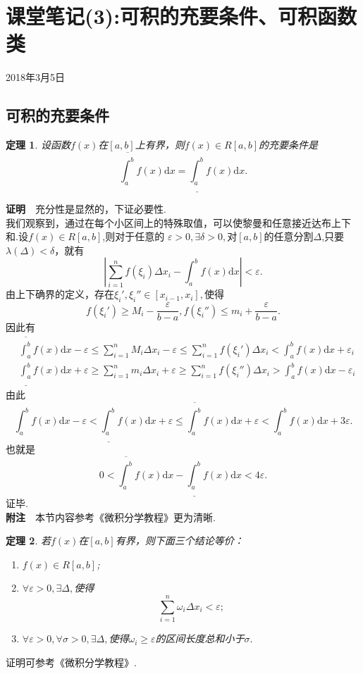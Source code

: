 \documentclass[UTF8]{article}
\newcommand{\dx}{\mathrm{d}x}
\newcommand{\zm}{\textbf{证明}$\quad$}
\newcommand{\fz}{\textbf{附注}$\quad$}
\newtheorem{thm}{\hspace{2em}定理}[section]
\begin{document}
\section{课堂笔记(3):可积的充要条件、可积函数类}
\begin{center}
  2018年3月5日
\end{center}
\subsection{可积的充要条件}
\begin{thm}
  设函数$f(x)$在$[a,b]$上有界，则$f(x)\in R[a,b]$的充要条件是
  $$\overline{\int_a^b}f(x)\dx=\underline{\int_a^b}f(x)\dx.$$
\end{thm}
\zm 充分性是显然的，下证必要性.\\
我们观察到，通过在每个小区间上的特殊取值，可以使黎曼和任意接近达布上下和.设$f(x)\in R[a,b]$,则对于任意的
$\varepsilon>0,\exists\delta>0,$对$[a,b]$的任意分割$\Delta$,只要$\lambda(\Delta)<\delta$，就有
$$\left|\sum_{i=1}^nf(\xi_i)\Delta x_i-\int_a^bf(x)\dx\right|<\varepsilon.$$
由上下确界的定义，存在$\xi_i',\xi_i''\in[x_{i-1},x_i],$使得
$$f(\xi_i')\ge M_i-\frac{\varepsilon}{b-a},f(\xi_i'')\le m_i+\frac{\varepsilon}{b-a}.$$
因此有
\begin{align*}
  &\overline{\int_a^b}f(x)\dx-\varepsilon\le\sum_{i=1}^nM_i\Delta x_i-\varepsilon\le\sum_{i=1}^nf(\xi_i')\Delta x_i<
    \int_a^bf(x)\dx+\varepsilon_i\\
  &\underline{\int_a^b}f(x)\dx+\varepsilon\ge\sum_{i=1}^nm_i\Delta x_i+\varepsilon\ge\sum_{i=1}^nf(\xi_i'')\Delta x_i>
    \int_a^bf(x)\dx-\varepsilon_i
\end{align*}
由此
$$\int_a^bf(x)\dx-\varepsilon<\underline{\int_a^b}f(x)\dx+\varepsilon\le\overline{\int_a^b}f(x)\dx+\varepsilon<
\int_a^bf(x)\dx+3\varepsilon.$$
也就是
$$0<\overline{\int_a^b}f(x)\dx-\underline{\int_a^b}f(x)\dx<4\varepsilon.$$
证毕.\\
\fz 本节内容参考《微积分学教程》更为清晰.
\begin{thm}
  若$f(x)$在$[a,b]$有界，则下面三个结论等价：
  \begin{enumerate}
    \item $f(x)\in R[a,b]$;
    \item $\forall\varepsilon>0,\exists\Delta,$使得
    $$\sum_{i=1}^n\omega_i\Delta x_i<\varepsilon;$$
    \item $\forall\varepsilon>0,\forall\sigma>0,\exists\Delta,$使得$\omega_i\ge\varepsilon$的区间长度总和小于$\sigma.$
  \end{enumerate}
\end{thm}
证明可参考《微积分学教程》.\\
\end{document}
